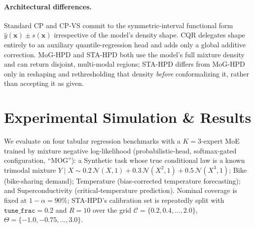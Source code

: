 \documentclass[10pt,twocolumn,a4paper]{article}
\begin{document}
\paragraph{Architectural differences.} Standard CP and CP-VS commit to the symmetric-interval
functional form $\hat y(\bm x)\pm s(\bm x)$ irrespective of the model's density shape. CQR
delegates shape entirely to an auxiliary quantile-regression head and adds only a global additive
correction. MoG-HPD and STA-HPD both use the model's full mixture density and can return disjoint,
multi-modal regions; STA-HPD differs from MoG-HPD only in reshaping and rethresholding that density
\emph{before} conformalizing it, rather than accepting it as given.

\section{Experimental Simulation \& Results}
\label{sec:experiments}
We evaluate on four tabular regression benchmarks with a $K=3$-expert MoE trained by mixture
negative log-likelihood (probabilistic-head, softmax-gated configuration, ``MOG''): a Synthetic
task whose true conditional law is a known trimodal mixture
$Y\mid X \sim 0.2\,\mathcal N(X,1)+0.3\,\mathcal N(X^2,1)+0.5\,\mathcal N(X^3,1)$; Bike
(bike-sharing demand); Temperature (bias-corrected temperature forecasting); and
Superconductivity (critical-temperature prediction). Nominal coverage is fixed at
$1-\alpha=90\%$; STA-HPD's calibration set is repeatedly split with $\texttt{tune\_frac}=0.2$ and
$R=10$ over the grid $\mathcal C=\{0.2,0.4,\dots,2.0\}$, $\Theta=\{-1.0,-0.75,\dots,3.0\}$.
\end{document}
